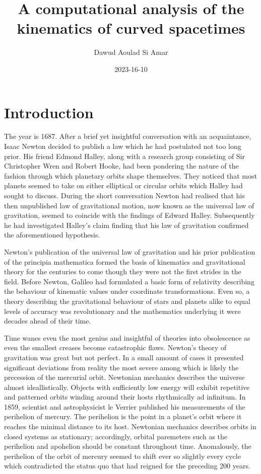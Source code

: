 \documentclass{article}
\title{A computational analysis of the kinematics of curved spacetimes}
\date{2023-16-10}
\author{Dawud Aoulad Si Amar}
\begin{document}
  \maketitle
  \newpage
  
  \section{Introduction}

  The year is 1687. After a brief yet insightful conversation with an acquaintance, Isaac Newton decided to publish a law which he had postulated not too long prior. His friend Edmond Halley, along with a research group consisting of Sir Christopher Wren and Robert Hooke, had been pondering the nature of the fashion through which planetary orbits shape themselves. They noticed that most planets seemed to take on either elliptical or circular orbits which Halley had sought to discuss. During the short conversation Newton had realised that his then unpublished law of gravitational motion, now known as the universal law of gravitation, seemed to coincide with the findings of Edward Halley. Subsequently he had investigated Halley's claim finding that his law of gravitation confirmed the aforementioned hypothesis. 

  Newton's publication of the universal law of gravitation and his prior publication of the principia mathematica formed the basis of kinematics and gravitational theory for the centuries to come though they were not the first strides in the field. Before Newton, Galileo had formulated a basic form of relativity describing the behaviour of kinematic values under coordinate transformations. Even so, a theory describing the gravitational behaviour of stars and planets alike to equal levels of accuracy was revolutionary and the mathematics underlying it were decades ahead of their time.

  Time wanes even the most genius and insightful of theories into obsolescence as even the smallest creases become catastrophic flaws. Newton's theory of gravitation was great but not perfect. In a small amount of cases it presented significant deviations from reality the most severe among which is likely the precession of the mercurial orbit. Newtonian mechanics describes the universe almost ideallistically. Objects with sufficiently low energy will exhibit repetitive and patterned orbits winding around their hosts rhythmically ad infinitum. In 1859, scientist and astrophysicist  le Verrier published his measurements of the perihelion of mercury. The perihelion is the point in a planet's orbit where it reaches the minimal distance to its host. Newtonian mechanics describes orbits in closed systems as stationary; accordingly, orbital paremeters such as the perihelion and apohelion should be constant throughout time. Anomalously, the perihelion of the orbit of mercury seemed to shift ever so slightly every cycle which contradicted the status quo that had reigned for the preceding 200 years. 
\end{document}
